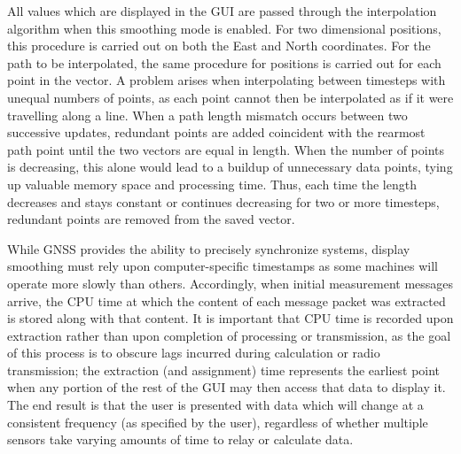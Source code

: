 \documentclass[twocolumn,10pt]{article}
\begin{document}
    All values which are displayed in the GUI are passed through the interpolation algorithm when this smoothing mode is enabled.
    For two dimensional positions, this procedure is carried out on both the East and North coordinates. 
    For the path to be interpolated,  the same procedure for positions is carried out for each point in the vector. A problem arises when interpolating between timesteps with unequal numbers of points, as each point cannot then be interpolated as if it were travelling along a line. When a path length mismatch occurs between two successive updates, redundant points are added coincident with the rearmost path point until the two vectors are equal in length. When the number of points is decreasing, this alone would lead to a buildup of unnecessary data points, tying up valuable memory space and processing time. Thus, each time the length decreases and stays constant or continues decreasing for two or more timesteps, redundant points are removed from the saved vector.

    While GNSS provides the ability to precisely synchronize systems, display smoothing must rely upon computer-specific timestamps as some machines will operate more slowly than others. Accordingly, when initial measurement messages arrive, the CPU time at which the content of each message packet was extracted is stored along with that content. It is important that CPU time is recorded upon extraction rather than upon completion of processing or transmission, as the goal of this process is to obscure lags incurred during calculation or radio transmission; the extraction (and assignment) time represents the earliest point when any portion of the rest of the GUI may then access that data to display it. The end result is that the user is presented with data which will change at a consistent frequency (as specified by the user), regardless of whether multiple sensors take varying amounts of time to relay or calculate data.


\end{document}
